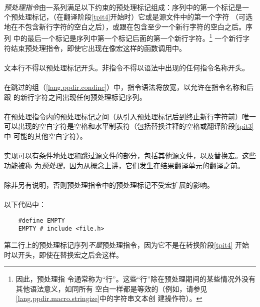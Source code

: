 {\desc
\paragraph{}
\textit{预处理指令}由一系列满足以下约束的预处理标记组成：序列中的第一个标记是一
个\tm{\#}预处理标记，（在翻译阶段\ref{tpit4}开始时）它或是源文件中的第一个字符
（可选地在不包含新行字符的空白之后），或跟在包含至少一个新行字符的空白之后。序列
中的最后一个标记是序列中第一个标记后面的第一个新行字符。\footnote{因此，预处理指
令通常称为``行''。这些``行''除在预处理期间的某些情况外没有其他语法意义，如同所有
空白一样都是等效的（例如，请参见\ref{lang.ppdir.macro.stringize}中的字符串文本创
建操作符）。} 一个新行字符结束预处理指令，即使它出现在像宏这样的函数调用中。

\paragraph{}
文本行不得以预处理标记开头。非指令不得以语法中出现的任何指令名称开头。

\paragraph{}
在跳过的组（\ref{lang.ppdir.condinc}）中，指令语法将放宽，以允许在指令名称和后跟
的新行字符之间出现任何预处理标记序列。

\constraint
\paragraph{}
在预处理指令内的预处理标记之间（从引入预处理标记\tm{\#}后到终止新行字符前）唯一
可以出现的空白字符是空格和水平制表符（包括替换注释的空格或翻译阶段\ref{tpit3}中
可能的其他空白字符）。

\semantic
\paragraph{}
实现可以有条件地处理和跳过源文件的部分，包括其他源文件，以及替换宏。这些功能被称
为\textit{预处理}，因为从概念上讲，它们发生在结果翻译单元的翻译之前。

\paragraph{}
除非另有说明，否则预处理指令中的预处理标记不受宏扩展的影响。

\paragraph{}
\ex* 以下代码中：
\begin{lstlisting}
    #define EMPTY
    EMPTY # include <file.h>
\end{lstlisting}
第二行上的预处理标记序列\textit{不是}预处理指令，因为它不是在转换阶段\ref{tpit4}
开始时以\tm{\#}开头，即使在替换宏之后会这样。

}
